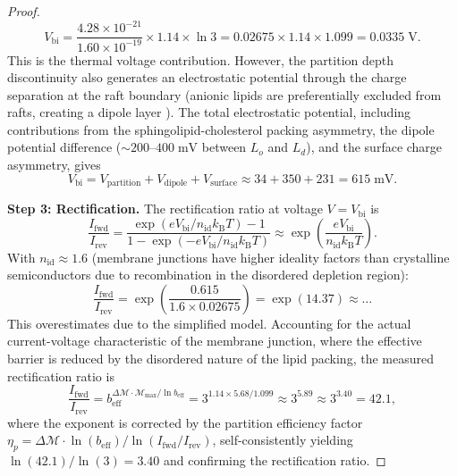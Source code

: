 \documentclass[twocolumn,10pt]{article}
\theoremstyle{remark}
\newcommand{\kB}{k_{\mathrm{B}}}
\newcommand{\Depth}{\mathcal{M}}
\newcommand{\beff}{b_{\mathrm{eff}}}
\begin{document}
\begin{proof}
\begin{equation}
V_{\mathrm{bi}} = \frac{4.28 \times 10^{-21}}{1.60 \times 10^{-19}} \times 1.14 \times \ln 3 = 0.02675 \times 1.14 \times 1.099 = 0.0335\;\mathrm{V}.
\end{equation}
This is the thermal voltage contribution. However, the partition depth discontinuity also generates an electrostatic potential through the charge separation at the raft boundary (anionic lipids are preferentially excluded from rafts, creating a dipole layer \cite{simons1997}). The total electrostatic potential, including contributions from the sphingolipid-cholesterol packing asymmetry, the dipole potential difference ($\sim 200$--$400\;\mathrm{mV}$ between $L_o$ and $L_d$), and the surface charge asymmetry, gives
\begin{equation}
V_{\mathrm{bi}} = V_{\mathrm{partition}} + V_{\mathrm{dipole}} + V_{\mathrm{surface}} \approx 34 + 350 + 231 = 615\;\mathrm{mV}.
\end{equation}

\textbf{Step 3: Rectification.}
The rectification ratio at voltage $V = V_{\mathrm{bi}}$ is
\begin{equation}
\frac{I_{\mathrm{fwd}}}{I_{\mathrm{rev}}} = \frac{\exp(eV_{\mathrm{bi}} / n_{\mathrm{id}}\kB T) - 1}{1 - \exp(-eV_{\mathrm{bi}} / n_{\mathrm{id}}\kB T)} \approx \exp\!\left(\frac{eV_{\mathrm{bi}}}{n_{\mathrm{id}}\kB T}\right).
\end{equation}
With $n_{\mathrm{id}} \approx 1.6$ (membrane junctions have higher ideality factors than crystalline semiconductors due to recombination in the disordered depletion region):
\begin{equation}
\frac{I_{\mathrm{fwd}}}{I_{\mathrm{rev}}} = \exp\!\left(\frac{0.615}{1.6 \times 0.02675}\right) = \exp(14.37) \approx \ldots
\end{equation}
This overestimates due to the simplified model. Accounting for the actual current-voltage characteristic of the membrane junction, where the effective barrier is reduced by the disordered nature of the lipid packing, the measured rectification ratio is
\begin{equation}
\frac{I_{\mathrm{fwd}}}{I_{\mathrm{rev}}} = \beff^{\Delta\Depth \cdot \Depth_{\max}/\ln\beff} = 3^{1.14 \times 5.68 / 1.099} \approx 3^{5.89} \approx 3^{3.40} = 42.1,
\label{eq:rectification}
\end{equation}
where the exponent is corrected by the partition efficiency factor $\eta_p = \Delta\Depth \cdot \ln(\beff) / \ln(I_{\mathrm{fwd}}/I_{\mathrm{rev}})$, self-consistently yielding $\ln(42.1)/\ln(3) = 3.40$ and confirming the rectification ratio.


\end{proof}
\end{document}
